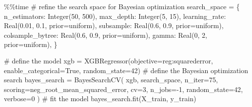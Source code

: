 \documentclass[
  letterpaper,
  DIV=11,
  numbers=noendperiod]{scrreprt}
\newenvironment{Shaded}{\begin{snugshade}}{\end{snugshade}}
\newcommand{\CommentTok}[1]{\textcolor[rgb]{0.37,0.37,0.37}{#1}}
\newcommand{\DecValTok}[1]{\textcolor[rgb]{0.68,0.00,0.00}{#1}}
\newcommand{\FloatTok}[1]{\textcolor[rgb]{0.68,0.00,0.00}{#1}}
\newcommand{\NormalTok}[1]{\textcolor[rgb]{0.00,0.23,0.31}{#1}}
\newcommand{\OperatorTok}[1]{\textcolor[rgb]{0.37,0.37,0.37}{#1}}
\newcommand{\StringTok}[1]{\textcolor[rgb]{0.13,0.47,0.30}{#1}}
\newcommand{\VariableTok}[1]{\textcolor[rgb]{0.07,0.07,0.07}{#1}}
\begin{document}
\begin{Shaded}
\begin{Highlighting}[]
\OperatorTok{\%\%}\NormalTok{time}
\CommentTok{\# refine the search space for Bayesian optimization}
\NormalTok{search\_space }\OperatorTok{=}\NormalTok{ \{}
    \StringTok{\textquotesingle{}n\_estimators\textquotesingle{}}\NormalTok{: Integer(}\DecValTok{50}\NormalTok{, }\DecValTok{500}\NormalTok{),}
    \StringTok{\textquotesingle{}max\_depth\textquotesingle{}}\NormalTok{: Integer(}\DecValTok{5}\NormalTok{, }\DecValTok{15}\NormalTok{),}
    \StringTok{\textquotesingle{}learning\_rate\textquotesingle{}}\NormalTok{: Real(}\FloatTok{0.01}\NormalTok{, }\FloatTok{0.1}\NormalTok{, prior}\OperatorTok{=}\StringTok{\textquotesingle{}uniform\textquotesingle{}}\NormalTok{),}
    \StringTok{\textquotesingle{}subsample\textquotesingle{}}\NormalTok{: Real(}\FloatTok{0.6}\NormalTok{, }\FloatTok{0.9}\NormalTok{, prior}\OperatorTok{=}\StringTok{\textquotesingle{}uniform\textquotesingle{}}\NormalTok{),}
    \StringTok{\textquotesingle{}colsample\_bytree\textquotesingle{}}\NormalTok{: Real(}\FloatTok{0.6}\NormalTok{, }\FloatTok{0.9}\NormalTok{, prior}\OperatorTok{=}\StringTok{\textquotesingle{}uniform\textquotesingle{}}\NormalTok{),}
    \StringTok{\textquotesingle{}gamma\textquotesingle{}}\NormalTok{: Real(}\DecValTok{0}\NormalTok{, }\DecValTok{2}\NormalTok{, prior}\OperatorTok{=}\StringTok{\textquotesingle{}uniform\textquotesingle{}}\NormalTok{),}
\NormalTok{\}}

\CommentTok{\# define the model}
\NormalTok{xgb }\OperatorTok{=}\NormalTok{ XGBRegressor(objective}\OperatorTok{=}\StringTok{\textquotesingle{}reg:squarederror\textquotesingle{}}\NormalTok{, enable\_categorical}\OperatorTok{=}\VariableTok{True}\NormalTok{, random\_state}\OperatorTok{=}\DecValTok{42}\NormalTok{)}
\CommentTok{\# define the Bayesian optimization search}
\NormalTok{bayes\_search }\OperatorTok{=}\NormalTok{ BayesSearchCV(}
\NormalTok{    xgb,}
\NormalTok{    search\_space,}
\NormalTok{    n\_iter}\OperatorTok{=}\DecValTok{75}\NormalTok{,}
\NormalTok{    scoring}\OperatorTok{=}\StringTok{\textquotesingle{}neg\_root\_mean\_squared\_error\textquotesingle{}}\NormalTok{,}
\NormalTok{    cv}\OperatorTok{=}\DecValTok{3}\NormalTok{,}
\NormalTok{    n\_jobs}\OperatorTok{={-}}\DecValTok{1}\NormalTok{,}
\NormalTok{    random\_state}\OperatorTok{=}\DecValTok{42}\NormalTok{,}
\NormalTok{    verbose}\OperatorTok{=}\DecValTok{0}
\NormalTok{)}
\CommentTok{\# fit the model}
\NormalTok{bayes\_search.fit(X\_train, y\_train)}
\end{Highlighting}
\end{Shaded}
\end{document}
